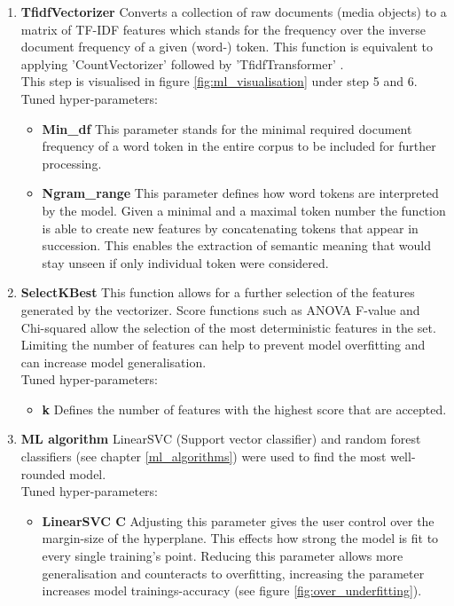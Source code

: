 \begin{enumerate}
    \item \textbf{TfidfVectorizer} Converts a collection of raw documents (media objects) to a matrix of TF-IDF features which stands for the frequency over the inverse document frequency of a given (word-) token. This function is equivalent to applying 'CountVectorizer' followed by 'TfidfTransformer' \parencite{Scikit-learn2018}.\\
    This step is visualised in figure \ref{fig:ml_visualisation} under step 5 and 6.\\
    Tuned hyper-parameters:
    \begin{itemize}
        \item \textbf{Min\_df} This parameter stands for the minimal required document frequency of a word token in the entire corpus to be included for further processing.
        \item \textbf{Ngram\_range} This parameter defines how word tokens are interpreted by the model. Given a minimal and a maximal token number the function is able to create new features by concatenating tokens that appear in succession. This enables the extraction of semantic meaning that would stay unseen if only individual token were considered.
    \end{itemize}
    
    \item \textbf{SelectKBest} This function allows for a further selection of the features generated by the vectorizer. Score functions such as ANOVA F-value and Chi-squared allow the selection of the most deterministic features in the set. Limiting the number of features can help to prevent model overfitting and can increase model generalisation.\\
    Tuned hyper-parameters:
    \begin{itemize}
        \item \textbf{k} Defines the number of features with the highest score that are accepted.
    \end{itemize}
    
    \item \textbf{ML algorithm} LinearSVC (Support vector classifier) and random forest classifiers (see chapter \ref{ml_algorithms}) were used to find the most well-rounded model.\\
    Tuned hyper-parameters:
    \begin{itemize}
        \item \textbf{LinearSVC C} Adjusting this parameter gives the user control over the margin-size of the hyperplane. This effects how strong the model is fit to every single training's point. Reducing this parameter allows more generalisation and counteracts to overfitting, increasing the parameter increases model trainings-accuracy (see figure \ref{fig:over_underfitting}).
        

\end{itemize}
\end{enumerate}
